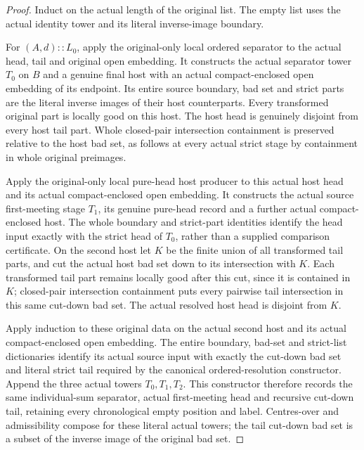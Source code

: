 \begin{proof}
Induct on the actual length of the original list. The empty list uses
the actual identity tower and its literal inverse-image boundary.

For $(A,d)::L_0$, apply the original-only local ordered separator to
the actual head, tail and original open embedding. It constructs the
actual separator tower $T_0$ on $B$ and a genuine final host with an
actual compact-enclosed open embedding of its endpoint. Its entire
source boundary, bad set and strict parts are the literal inverse
images of their host counterparts. Every transformed original part
is locally good on this host. The host head is genuinely disjoint from
every host tail part. Whole closed-pair intersection containment is
preserved relative to the host bad set, as follows at every actual
strict stage by containment in whole original preimages.

Apply the original-only local pure-head host producer to this actual
host head and its actual compact-enclosed open embedding. It constructs
the actual source first-meeting stage $T_1$, its genuine pure-head
record and a further actual compact-enclosed host. The whole boundary
and strict-part identities identify the head input exactly with the
strict head of $T_0$, rather than a supplied comparison certificate.
On the second host let $K$ be the finite union of all transformed tail
parts, and cut the actual host bad set down to its intersection with
$K$. Each transformed tail part remains locally good after this cut,
since it is contained in $K$; closed-pair intersection containment
puts every pairwise tail intersection in this same cut-down bad set.
The actual resolved host head is disjoint from $K$.

Apply induction to these original data on the actual second host and
its actual compact-enclosed open embedding. The entire boundary,
bad-set and strict-list dictionaries identify its actual source input
with exactly the cut-down bad set and literal strict tail required by
the canonical ordered-resolution constructor. Append the three actual
towers $T_0,T_1,T_2$. This constructor therefore records the same
individual-sum separator, actual first-meeting head and recursive
cut-down tail, retaining every chronological empty position and label.
Centres-over and admissibility compose for these literal actual towers;
the tail cut-down bad set is a subset of the inverse image of the
original bad set.


\end{proof}
